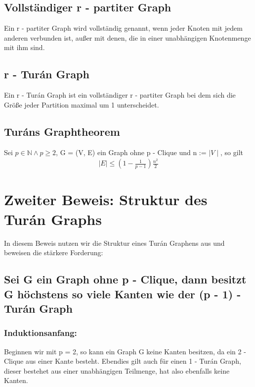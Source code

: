 \documentclass[12pt, a4paper]{article}
\begin{document}
\subsection{Vollständiger r - partiter Graph}
\label{theorem:vollstandiger-r-partiter-graph}
Ein r - partiter Graph wird vollständig genannt, wenn jeder Knoten mit jedem anderen verbunden ist, außer mit denen, die in einer unabhängigen Knotenmenge mit ihm sind.


\subsection{r - Turán Graph}
\label{theorem:turan-graph}
Ein r - Turán Graph ist ein vollständiger r - partiter Graph bei dem sich die Größe jeder Partition maximal um 1 unterscheidet.


\subsection{Turáns Graphtheorem}
Sei $p \in \mathbb{N} \wedge p \ge 2$,  G = (V, E) ein Graph ohne p - Clique und n := $\mid V \mid$, so gilt
\begin{align} 
\mid E \mid \le (1- \frac{1}{p-1}) \frac{n^2}{2}
\end{align}



\section{Zweiter Beweis: Struktur des Turán Graphs}
\label{proof/second:zweiter-beweis-struktur-des-turan-graphs}\label{proof/second::doc}
In diesem Beweis nutzen wir die Struktur eines Turán Graphens aus und beweisen die stärkere Forderung:


\subsection{Sei G ein Graph ohne p - Clique, dann besitzt G höchstens so viele Kanten wie der (p - 1) - Turán Graph}
\label{proof/second:sei-g-ein-graph-ohne-p-clique-dann-besitzt-g-hochstens-so-viele-kanten-wie-der-p-1-turan-graph}
\subsubsection{Induktionsanfang:}

Beginnen wir mit p = 2, so kann ein Graph G keine Kanten besitzen, da ein 2 - Clique aus einer Kante besteht. Ebendies gilt auch für einen 1 - Turán Graph, dieser bestehet aus einer unabhängigen Teilmenge, hat also ebenfalls keine Kanten.
\end{document}
